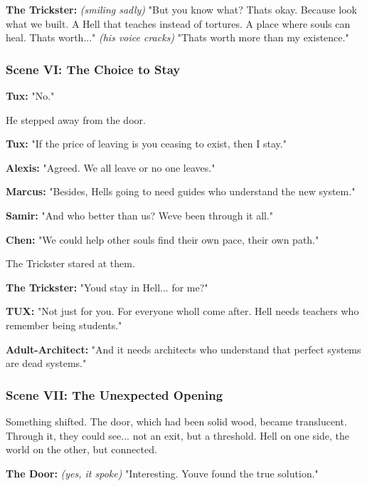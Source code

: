 \textbf{The Trickster:} \emph{(smiling sadly)} "But you know what? That\textquotesingle s okay. Because look what we built. A Hell that teaches instead of tortures. A place where souls can heal. That\textquotesingle s worth..." \emph{(his voice cracks)} "That\textquotesingle s worth more than my existence."

\bookdivider

\subsubsection{Scene VI: The Choice to Stay}\label{scene-vi-the-choice-to-stay}

\textbf{Tux:} "No."

He stepped away from the door.

\textbf{Tux:} "If the price of leaving is you ceasing to exist, then I stay."

\textbf{Alexis:} "Agreed. We all leave or no one leaves."

\textbf{Marcus:} "Besides, Hell\textquotesingle s going to need guides who understand the new system."

\textbf{Samir:} "And who better than us? We\textquotesingle ve been through it all."

\textbf{Chen:} "We could help other souls find their own pace, their own path."

The Trickster stared at them.

\textbf{The Trickster:} "You\textquotesingle d stay in Hell... for me?"

\textbf{TUX:} "Not just for you. For everyone who\textquotesingle ll come after. Hell needs teachers who remember being students."

\textbf{Adult-Architect:} "And it needs architects who understand that perfect systems are dead systems."

\bookdivider

\subsubsection{Scene VII: The Unexpected Opening}\label{scene-vii-the-unexpected-opening}

Something shifted. The door, which had been solid wood, became translucent. Through it, they could see... not an exit, but a threshold. Hell on one side, the world on the other, but connected.

\textbf{The Door:} \emph{(yes, it spoke)} "Interesting. You\textquotesingle ve found the true solution."

